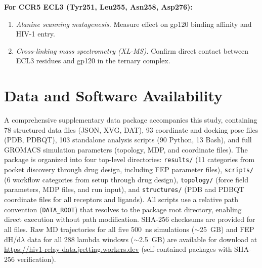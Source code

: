 \documentclass[11pt,a4paper]{article}
\begin{document}
\textbf{For CCR5 ECL3 (Tyr251, Leu255, Asn258, Asp276):}

\begin{enumerate}[nosep,leftmargin=1.5em]
    \item \textit{Alanine scanning mutagenesis.} Measure effect on gp120 binding affinity and HIV-1 entry.
    \item \textit{Cross-linking mass spectrometry (XL-MS).} Confirm direct contact between ECL3 residues and gp120 in the ternary complex.
\end{enumerate}

\section{Data and Software Availability}

A comprehensive supplementary data package accompanies this study, containing 78 structured data files (JSON, XVG, DAT), 93 coordinate and docking pose files (PDB, PDBQT), 103 standalone analysis scripts (90 Python, 13 Bash), and full GROMACS simulation parameters (topology, MDP, and coordinate files). The package is organized into four top-level directories: \texttt{results/} (11 categories from pocket discovery through drug design, including FEP parameter files), \texttt{scripts/} (6 workflow categories from setup through drug design), \texttt{topology/} (force field parameters, MDP files, and run input), and \texttt{structures/} (PDB and PDBQT coordinate files for all receptors and ligands). All scripts use a relative path convention (\texttt{DATA\_ROOT}) that resolves to the package root directory, enabling direct execution without path modification. SHA-256 checksums are provided for all files. Raw MD trajectories for all five 500~ns simulations (${\sim}$25~GB) and FEP dH/d$\lambda$ data for all 288 lambda windows (${\sim}$2.5~GB) are available for download at \url{https://hiv1-relay-data.jretting.workers.dev} (self-contained packages with SHA-256 verification).
\end{document}
